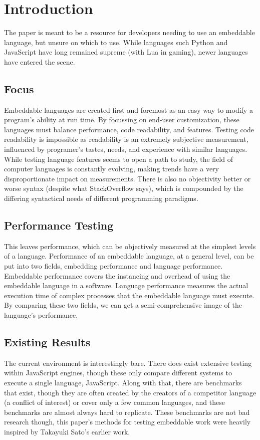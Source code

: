\section{Introduction} \label{sec:introduction}
The paper is meant to be a resource for developers needing to use an embeddable language, but unsure on which to use. While languages such Python and JavaScript have long remained supreme (with Lua in gaming)\cite{trend:jslua}, newer languages have entered the scene.

\subsection{Focus}
Embeddable languages are created first and foremost as an easy way to modify a program's ability at run time. By focussing on end-user customization, these languages must balance performance, code readability, and features. Testing code readability is impossible as readability is an extremely subjective measurement, influenced by programer's tastes, needs, and experience with similar languages. While testing language features seems to open a path to study, the field of computer languages is constantly evolving, making trends have a very disproportionate impact on measurements. There is also no objectivity better or worse syntax (despite what StackOverflow says), which is compounded by the differing syntactical needs of different programming paradigms.

\subsection{Performance Testing}
This leaves performance, which can be objectively measured at the simplest levels of a language. Performance of an embeddable language, at a general level, can be put into two fields, embedding performance and language performance. Embeddable performance covers the instancing and overhead of using the embeddable language in a software. Language performance measures the actual execution time of complex processes that the embeddable language must execute. By comparing these two fields, we can get a semi-comprehensive image of the language's performance.

\subsection{Existing Results}
The current environment is interestingly bare. There does exist extensive testing within JavaScript engines, though these only compare different systems to execute a single language, JavaScript\cite{arewefastyet}. Along with that, there are benchmarks that exist, though they are often created by the creators of a competitor language (a conflict of interest) or cover only a few common languages, and these benchmarks are almost always hard to replicate. These benchmarks are not bad research though, this paper's methods for testing embeddable work were heavily inspired by Takayuki Sato's earlier work\cite{embench}.
